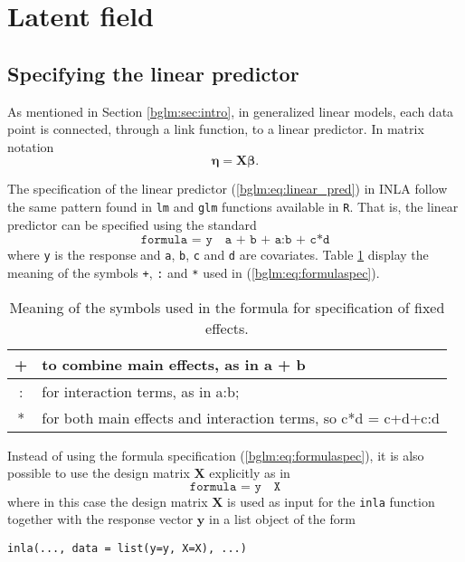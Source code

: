 \documentclass[a4paper,11pt]{report}
\def\bs#1{\ensuremath{\boldsymbol{#1}}} %
\begin{document}
\section{Latent field}

\subsection{Specifying the linear predictor}

As mentioned in Section \ref{bglm:sec:intro}, in generalized linear
models, each data point is connected, through a link function, to a
linear predictor. In matrix notation
\begin{equation}
    \bs{\eta} = \bs{X}\bs{\beta}.
    \label{bglm:eq:linear_pred}
\end{equation}

The specification of the linear predictor (\ref{bglm:eq:linear_pred})
in INLA follow the same pattern found in \texttt{lm} and \texttt{glm}
functions available in \texttt{R}.  That is, the linear predictor can
be specified using the standard
\begin{equation}
    \texttt{formula = y ~ a + b + a:b + c*d}
    \label{bglm:eq:formulaspec}
\end{equation}
where \texttt{y} is the response and \texttt{a}, \texttt{b},
\texttt{c} and \texttt{d} are covariates.  Table
\ref{bglm:tab:lmsymbols} display the meaning of the symbols
\texttt{+}, \texttt{:} and \texttt{*} used in
(\ref{bglm:eq:formulaspec}).

\begin{table}[ht!]
    \centering
    \begin{tabular}{|c|l|}
        \hline
        + & to combine main effects, as in a + b \\
        \hline
        : & for interaction terms, as in a:b; \\
        \hline
        * & for both main effects and interaction terms, so c*d = c+d+c:d \\
        \hline
    \end{tabular}
    \caption{Meaning of the symbols used in the formula for specification of fixed effects.}
    \label{bglm:tab:lmsymbols}
\end{table}

Instead of using the formula specification
(\ref{bglm:eq:formulaspec}), it is also possible to use the design
matrix $\bs{X}$ explicitly as in
\begin{equation}
    \texttt{formula = y ~ X}
    \label{bglm:eq:designspec}
\end{equation}
where in this case the design matrix $\bs{X}$ is used as input for the 
\texttt{inla} function together with the response vector $\bs{y}$ in 
a list object of the form
\begin{center}
    \texttt{inla(..., data = list(y=y, X=X), ...)}
\end{center}
\end{document}
